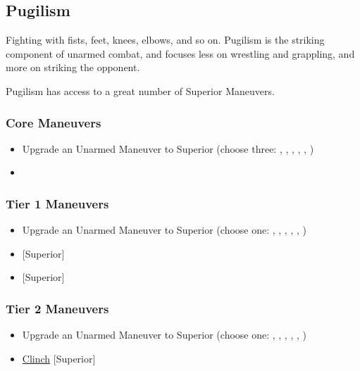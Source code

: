 \documentclass[oneside,11pt,english]{book}
\begin{document}
\subsection{Pugilism}
Fighting with fists, feet, knees, elbows, and so on. Pugilism is the striking
component of unarmed combat, and focuses less on wrestling and grappling, and
more on striking the opponent.  

Pugilism has access to a great number of Superior Maneuvers. 

\subsubsection{Core Maneuvers}
\vspace{-5pt}\begin{itemize}
  [itemsep=0.5mm]
\item Upgrade an Unarmed Maneuver to Superior (choose three: , , , , , )
\item {}
\end{itemize}

\subsubsection{Tier 1 Maneuvers}
\vspace{-5pt} \begin{itemize}
  [itemsep=0.5mm]
\item Upgrade an Unarmed Maneuver to Superior (choose one: , , , , , )
\item {} [Superior]
\item {} [Superior]
\end{itemize}
\subsubsection{Tier 2 Maneuvers}
\vspace{-5pt}\begin{itemize}
  [itemsep=0.5mm]
\item Upgrade an Unarmed Maneuver to Superior (choose one: , , , , , )
\item \hyperref[man:Clinch (Attack)]{Clinch} [Superior]
\end{itemize}
\end{document}
